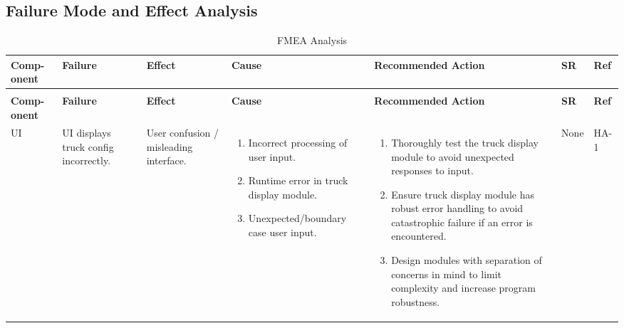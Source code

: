 \documentclass{article}
\begin{document}
\begin{landscape}

\section{Failure Mode and Effect Analysis}

\begin{longtable}{|p{} | p{} | p{} | p{} | p{} | p{} | p{}|}
  \caption{FMEA Analysis}
  \label{TblFMEA}\\
  \hline
  \textbf{Comp- onent} & \textbf{Failure} & \textbf{Effect} & \textbf{Cause} & \textbf{Recommended Action} & \textbf{SR} & \textbf{Ref}\\
  \hline
  \endfirsthead
  \caption[]{FMEA Analysis}\\
  \hline
  \textbf{Comp- onent} & \textbf{Failure} & \textbf{Effect} & \textbf{Cause} & \textbf{Recommended Action} & \textbf{SR} & \textbf{Ref}\\
  \hline
  \endhead
  UI & UI displays truck config incorrectly. & User confusion / misleading interface. &
  \begin{enumerate}[leftmargin=*, label={\alph*.}, itemsep=1pt, topsep=0pt, partopsep=0pt] 
    \item Incorrect processing of user input.
    \item Runtime error in truck display module.
    \item Unexpected/boundary case user input.
  \end{enumerate} &
  \begin{enumerate}[leftmargin=*, label={\alph*.}, itemsep=1pt, topsep=0pt, partopsep=0pt] 
    \item Thoroughly test the truck display module to avoid unexpected responses to input.
    \item Ensure truck display module has robust error handling to avoid catastrophic failure if an error is encountered.
    \item Design modules with separation of concerns in mind to limit complexity and increase program robustness.
  \end{enumerate} & 
  None & HA-1 \\

  \hline


\end{longtable}
\end{landscape}
\end{document}
